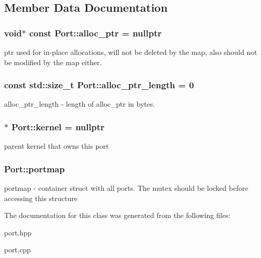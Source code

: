 \subsection{Member Data Documentation}
\hypertarget{class_port_a78bf16e68f1dd5312f37b4e2806a9cf8}{}
\subsubsection[{alloc\+\_\+ptr}]{\setlength{\rightskip}{0pt plus 5cm}void$\ast$ const Port\+::alloc\+\_\+ptr = nullptr\hspace{0.3cm}{\ttfamily [protected]}}\label{class_port_a78bf16e68f1dd5312f37b4e2806a9cf8}
ptr used for in-\/place allocations, will not be deleted by the map, also should not be modified by the map either. \hypertarget{class_port_a98d2e7e0e570e082465c692083300fa9}{}
\subsubsection[{alloc\+\_\+ptr\+\_\+length}]{\setlength{\rightskip}{0pt plus 5cm}const std\+::size\+\_\+t Port\+::alloc\+\_\+ptr\+\_\+length = 0\hspace{0.3cm}{\ttfamily [protected]}}\label{class_port_a98d2e7e0e570e082465c692083300fa9}
alloc\+\_\+ptr\+\_\+length -\/ length of alloc\+\_\+ptr in bytes. \hypertarget{class_port_ac17060db235459adaab87cdccb605884}{}
\subsubsection[{kernel}]{$\ast$ Port\+::kernel = nullptr\hspace{0.3cm}{\ttfamily [protected]}}\label{class_port_ac17060db235459adaab87cdccb605884}
parent kernel that owns this port \hypertarget{class_port_a537a8a0c2a47acbf8654f286200aee90}{}
\subsubsection[{portmap}]{ Port\+::portmap\hspace{0.3cm}{\ttfamily [protected]}}\label{class_port_a537a8a0c2a47acbf8654f286200aee90}
portmap -\/ container struct with all ports. The mutex should be locked before accessing this structure 

The documentation for this class was generated from the following files\+:\begin{DoxyCompactItemize}
\item 
port.\+hpp\item 
port.\+cpp\end{DoxyCompactItemize}

